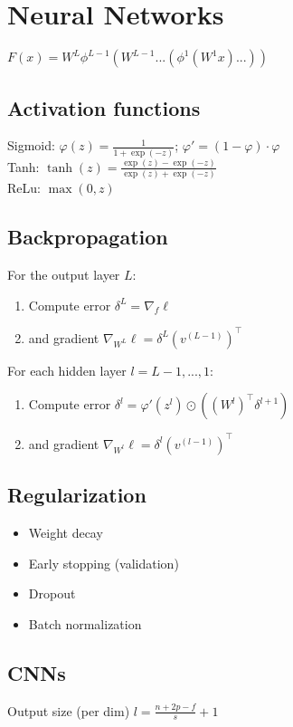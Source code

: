 \section*{Neural Networks}
$F(x)=W^{L}\phi^{L-1}(W^{L-1}...(\phi^{1}(W^{1}x)...))$

\subsection*{Activation functions}
Sigmoid: $\varphi(z) = \frac{1}{1+\exp(-z)}$;  $\varphi' = (1 - \varphi)\cdot\varphi$\\
Tanh: $\tanh(z) = \frac{\exp(z)-\exp(-z)}{\exp(z)+\exp(-z)}$\\
ReLu:  $\max(0,z)$

\subsection*{Backpropagation}
For the output layer $L$:
\begin{enumerate}[noitemsep,leftmargin=6mm,topsep=0pt,parsep=0pt,partopsep=0pt]
\item Compute error $\delta^{L} = \nabla_f\ell$
\item and gradient $\nabla_{W^L}\ell=\delta^L(v^{(L-1)})^\top$
\end{enumerate}
For each hidden layer $l=L-1,...,1$:
\begin{enumerate}[noitemsep,leftmargin=6mm,topsep=0pt,parsep=0pt,partopsep=0pt]
\item  Compute error $\delta^{l} =\varphi'(z^l)\odot ((W^l)^\top \delta^{l+1})$
\item and gradient $\nabla_{W^l}\ell=\delta^l(v^{(l-1)})^\top$
\end{enumerate}

\subsection*{Regularization}
\begin{itemize}[noitemsep,leftmargin=6mm,topsep=2pt,parsep=2pt,partopsep=2pt]
    \item Weight decay
    \item Early stopping (validation)
    \item Dropout
    \item Batch normalization
\end{itemize}

\subsection*{CNNs}
Output size (per dim) $l=\frac{n+2p-f}{s}+1$
\\
